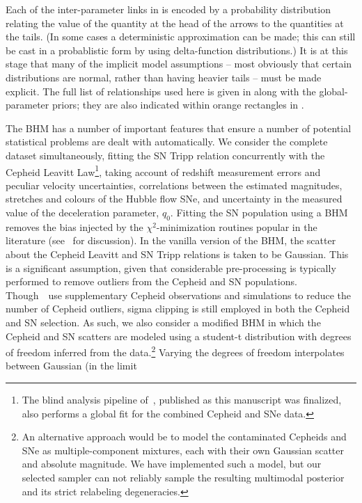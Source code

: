 \documentclass[a4paper,fleqn,usenatbib]{mnras}
\newcommand{\riess}{\citetalias{Riess_etal:2016}}
\newcommand{\decel}{\ensuremath{q_0}}
\begin{document}
{Each of the inter-parameter links in  is encoded by 
a probability distribution relating the value of the 
quantity at the head of the arrows to the quantities at the tails.
(In some cases a deterministic approximation can be made;
this can still be cast in a probablistic form by using 
delta-function distributions.)
It is at this stage that many of the implicit model assumptions -- most 
obviously that certain distributions are normal,
rather than having heavier tails -- must be made explicit.
The full list of relationships used here is given in  along
with the global-parameter priors; they are also indicated within orange
rectangles in .

The BHM has a number of important features that ensure a number of potential statistical problems are dealt with automatically.
We consider the complete dataset simultaneously, fitting the SN
Tripp relation concurrently with the Cepheid Leavitt Law\footnote{The blind analysis pipeline of~\cite{Zhang_etal:2017}, published as this manuscript was finalized, also performs a global fit for the combined Cepheid and SNe data.}, taking account of redshift 
measurement errors and peculiar velocity uncertainties, correlations between 
the estimated magnitudes, stretches and colours of the Hubble flow SNe, and uncertainty in the 
measured value of the deceleration parameter, $\decel$. Fitting the SN population using a BHM removes the bias injected by the $\chi^2$-minimization routines popular in the literature (see~\citealt{Kelly:2007,March_etal:2011,Mandel_etal:2016} for discussion). In the vanilla 
version of the BHM, the scatter about the Cepheid Leavitt and SN Tripp relations is taken to be Gaussian. This is a significant assumption, given 
that considerable pre-processing is typically performed to remove 
outliers from the Cepheid and SN populations. 
Though~\riess\ use supplementary Cepheid observations and simulations 
to reduce the number of Cepheid outliers, sigma clipping is still employed 
in both the Cepheid and SN selection. As such, we also consider
a modified BHM in which the Cepheid and SN scatters are modeled 
using a student-t distribution with degrees of freedom inferred from the data.\footnote{An  
alternative approach would be to model the contaminated Cepheids and SNe as multiple-component 
mixtures, each with their own Gaussian scatter and absolute magnitude. We have 
implemented such a model, but our selected sampler can not reliably sample the resulting 
multimodal posterior and its strict relabeling degeneracies.}
Varying the degrees of freedom interpolates between Gaussian (in the limit 
}
\end{document}
